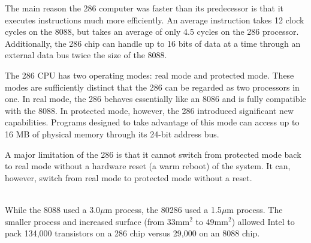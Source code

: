 \documentclass[book.tex]{subfiles}
\begin{document}
\par
The main reason the 286 computer was faster than its predecessor is that it executes instructions much more efficiently. An average instruction takes 12 clock cycles on the 8088, but takes an average of only 4.5 cycles on the 286 processor. Additionally, the 286 chip can handle up to 16 bits of data at a time through an external data bus twice the size of the 8088.\\

\par
The 286 CPU has two operating modes: real mode and protected mode. These modes are sufficiently distinct that the 286 can be regarded as two processors in one. In real mode, the 286 behaves essentially like an 8086 and is fully compatible with the 8088. In protected mode, however, the 286 introduced significant new capabilities. Programs designed to take advantage of this mode can access up to 16 MB of physical memory through its 24-bit address bus.\\

\par
A major limitation of the 286 is that it cannot switch from protected mode back to real mode without a hardware reset (a warm reboot) of the system. It can, however, switch from real mode to protected mode without a reset.\\

\\

\par
While the 8088 used a 3.0$\mu$m process, the 80286 used a 1.5$\mu$m process. The smaller process and increased surface (from 33mm$^2$ to 49mm$^2$) allowed Intel to pack 134,000 transistors on a 286 chip versus 29,000 on an 8088 chip.
\end{document}
